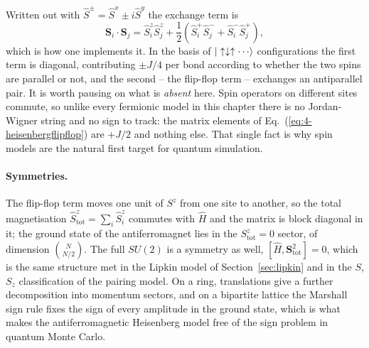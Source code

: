 Written out with $\hat{S}^{\pm}=\hat{S}^x\pm i\hat{S}^y$ the exchange term is
\begin{equation}
  \bm{S}_i\cdot\bm{S}_j
   = \hat{S}^z_i\hat{S}^z_j
     + \frac12\left(\hat{S}^+_i\hat{S}^-_j
                    + \hat{S}^-_i\hat{S}^+_j\right),
  \label{eq:4-heisenbergflipflop}
\end{equation}
which is how one implements it.  In the basis of $\bket{\uparrow\downarrow
\uparrow\cdots}$ configurations the first term is diagonal, contributing
$\pm J/4$ per bond according to whether the two spins are parallel or not,
and the second -- the flip-flop term -- exchanges an antiparallel pair.  It is
worth pausing on what is \emph{absent} here.  Spin operators on different
sites commute, so unlike every fermionic model in this chapter there is no
Jordan-Wigner string and no sign to track: the matrix elements of
Eq.~(\ref{eq:4-heisenbergflipflop}) are $+J/2$ and nothing else.  That single
fact is why spin models are the natural first target for quantum simulation.

\paragraph{Symmetries.}
The flip-flop term moves one unit of $S^z$ from one site to another, so the
total magnetisation $\hat{S}^z_{\mathrm{tot}}=\sum_i\hat{S}^z_i$ commutes with
$\hat{H}$ and the matrix is block diagonal in it; the ground state of the
antiferromagnet lies in the $S^z_{\mathrm{tot}}=0$ sector, of dimension
$\binom{N}{N/2}$.  The full $SU(2)$ is a symmetry as well, $[\hat{H},\bm{S}^2
_{\mathrm{tot}}]=0$, which is the same structure met in the Lipkin model of
Section~\ref{sec:lipkin} and in the $S$, $S_z$ classification of the pairing
model.  On a ring, translations give a further decomposition into momentum
sectors, and on a bipartite lattice the Marshall sign rule fixes the sign of
every amplitude in the ground state, which is what makes the
antiferromagnetic Heisenberg model free of the sign problem in quantum
Monte Carlo.

